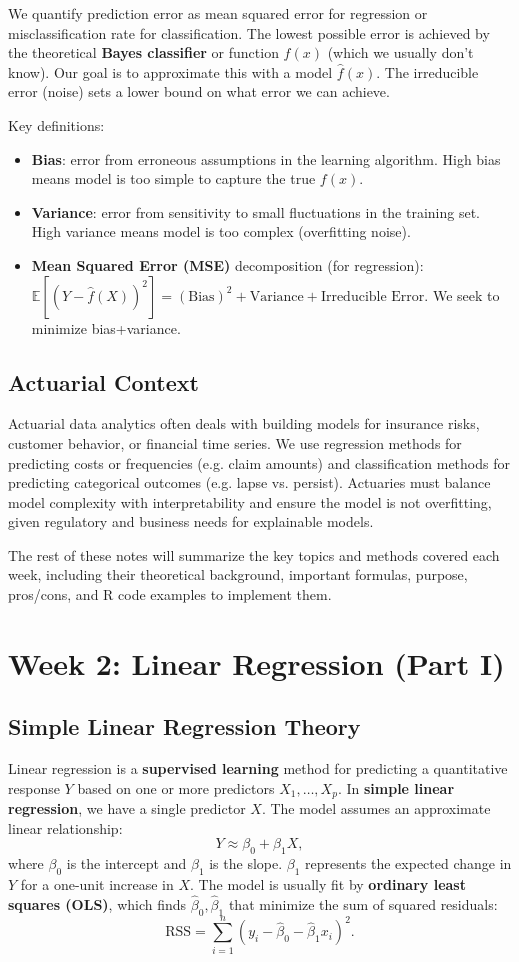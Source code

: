 \documentclass[11pt]{article}
\begin{document}
We quantify prediction error as mean squared error for regression or misclassification rate for classification. The lowest possible error is achieved by the theoretical \textbf{Bayes classifier} or function $f(x)$ (which we usually don't know). Our goal is to approximate this with a model $\hat f(x)$. The irreducible error (noise) sets a lower bound on what error we can achieve.

Key definitions:
\begin{itemize}
  \item \textbf{Bias}: error from erroneous assumptions in the learning algorithm. High bias means model is too simple to capture the true $f(x)$.
  \item \textbf{Variance}: error from sensitivity to small fluctuations in the training set. High variance means model is too complex (overfitting noise).
  \item \textbf{Mean Squared Error (MSE)} decomposition (for regression): $\mathbb{E}[ (Y - \hat f(X))^2 ] = (\text{Bias})^2 + \text{Variance} + \text{Irreducible Error}$. We seek to minimize bias+variance.
\end{itemize}

\subsection{Actuarial Context}
Actuarial data analytics often deals with building models for insurance risks, customer behavior, or financial time series. We use regression methods for predicting costs or frequencies (e.g. claim amounts) and classification methods for predicting categorical outcomes (e.g. lapse vs. persist). Actuaries must balance model complexity with interpretability and ensure the model is not overfitting, given regulatory and business needs for explainable models.

The rest of these notes will summarize the key topics and methods covered each week, including their theoretical background, important formulas, purpose, pros/cons, and R code examples to implement them.

\section{Week 2: Linear Regression (Part I)}
\subsection{Simple Linear Regression Theory}
Linear regression is a \textbf{supervised learning} method for predicting a quantitative response $Y$ based on one or more predictors $X_1,\ldots,X_p$. In \textbf{simple linear regression}, we have a single predictor $X$. The model assumes an approximate linear relationship:
\[ Y \approx \beta_0 + \beta_1 X, \]
where $\beta_0$ is the intercept and $\beta_1$ is the slope. $\beta_1$ represents the expected change in $Y$ for a one-unit increase in $X$. The model is usually fit by \textbf{ordinary least squares (OLS)}, which finds $\hat\beta_0, \hat\beta_1$ that minimize the sum of squared residuals:
\[ \text{RSS} = \sum_{i=1}^n (y_i - \hat\beta_0 - \hat\beta_1 x_i)^2. \]
\end{document}
